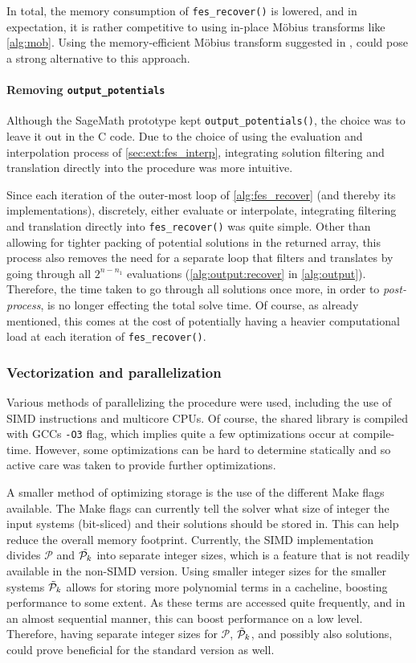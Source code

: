 In total, the memory consumption of \texttt{fes\_recover()} is lowered, and in expectation, it is rather competitive to using in-place Möbius transforms like \cref{alg:mob}. Using the memory-efficient Möbius transform suggested in \cite{eurocrypt-2021-30841}, could pose a strong alternative to this approach.

\paragraph*{Removing \texttt{output\_potentials}} Although the SageMath prototype kept \texttt{output\_potentials()}, the choice was to leave it out in the C code. Due to the choice of using the evaluation and interpolation process of \cref{sec:ext:fes_interp}, integrating solution filtering and translation directly into the procedure was more intuitive.

Since each iteration of the outer-most loop of \cref{alg:fes_recover} (and thereby its implementations), discretely, either evaluate or interpolate, integrating filtering and translation directly into \texttt{fes\_recover()} was quite simple. Other than allowing for tighter packing of potential solutions in the returned array, this process also removes the need for a separate loop that filters and translates by going through all $2^{n - n_1}$ evaluations (\cref{alg:output:recover} in \cref{alg:output}). Therefore, the time taken to go through all solutions once more, in order to \textit{post-process}, is no longer effecting the total solve time. Of course, as already mentioned, this comes at the cost of potentially having a heavier computational load at each iteration of \texttt{fes\_recover()}.

\subsubsection{Vectorization and parallelization} \label{sec:impl:opt:parallel}
Various methods of parallelizing the procedure were used, including the use of SIMD instructions and multicore CPUs. Of course, the shared library is compiled with GCCs \texttt{-O3} flag, which implies quite a few optimizations occur at compile-time. However, some optimizations can be hard to determine statically and so active care was taken to provide further optimizations. 

A smaller method of optimizing storage is the use of the different Make flags available. The Make flags can currently tell the solver what size of integer the input systems (bit-sliced) and their solutions should be stored in. This can help reduce the overall memory footprint. Currently, the SIMD implementation divides $\mathcal{P}$ and $\Tilde{\mathcal{P}_k}$ into separate integer sizes, which is a feature that is not readily available in the non-SIMD version. Using smaller integer sizes for the smaller systems $\Tilde{\mathcal{P}}_k$ allows for storing more polynomial terms in a cacheline, boosting performance to some extent. As these terms are accessed quite frequently, and in an almost sequential manner, this can boost performance on a low level. Therefore, having separate integer sizes for $\mathcal{P}$, $\Tilde{\mathcal{P}}_k$, and possibly also solutions, could prove beneficial for the standard version as well.

